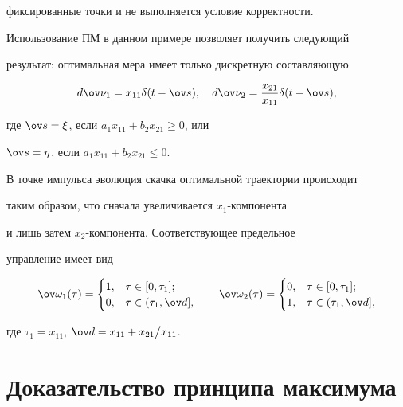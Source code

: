 фиксированные точки и не выполняется условие корректности.





Использование ПМ в данном примере позволяет получить следующий


результат: оптимальная мера имеет только дискретную составляющую


$$


d\ov \nu_1=x_{11}\delta(t-\ov s),\quad


d\ov\nu_2=\frac{x_{21}}{x_{11}}\delta(t-\ov s),


$$


где $\ov s=\xi$, если $a_1x_{11}+b_2x_{21}\geq 0$, или


$\ov s=\eta$, если $a_1x_{11}+b_2x_{21}\leq 0$.


В точке импульса эволюция скачка оптимальной траектории происходит


таким образом, что сначала увеличивается $x_1$-компонента


и лишь затем $x_2$-компонента. Соответствующее предельное


управление имеет вид


$$


\ov\omega_{1}(\tau)=


\begin{cases} 1, & \tau\in [0,\tau_1]; \\


0, & \tau\in (\tau_1,\ov d],


\end{cases}


\qquad


\ov\omega_{2}(\tau)=


\begin{cases}


0, & \tau\in [0,\tau_1]; \\ 1, & \tau\in (\tau_1,\ov d],


\end{cases}


$$


где $\tau_1=x_{11}$, $\ov d=x_{11}+{x_{21}}\big/{x_{11}}$.








\section{Доказательство принципа максимума}





